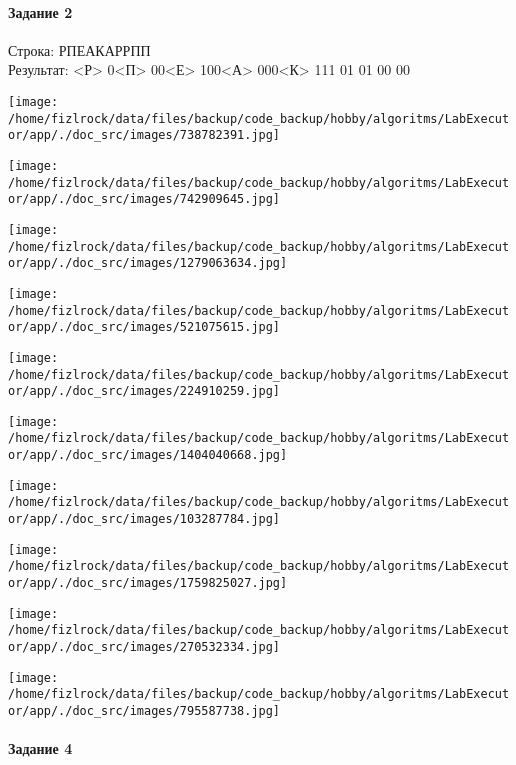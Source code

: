 \documentclass[a4paper, 12pt]{article}
\begin{document}
\paragraph{Задание 2}

Строка: 
РПЕАКАРРПП\\
Результат: <Р> 0<П> 00<Е> 100<А> 000<К> 111 01 01 00 00

\texttt{[image: /home/fizlrock/data/files/backup/code\_backup/hobby/algoritms/LabExecutor/app/./doc\_src/images/738782391.jpg]}

\texttt{[image: /home/fizlrock/data/files/backup/code\_backup/hobby/algoritms/LabExecutor/app/./doc\_src/images/742909645.jpg]}

\texttt{[image: /home/fizlrock/data/files/backup/code\_backup/hobby/algoritms/LabExecutor/app/./doc\_src/images/1279063634.jpg]}

\texttt{[image: /home/fizlrock/data/files/backup/code\_backup/hobby/algoritms/LabExecutor/app/./doc\_src/images/521075615.jpg]}

\texttt{[image: /home/fizlrock/data/files/backup/code\_backup/hobby/algoritms/LabExecutor/app/./doc\_src/images/224910259.jpg]}

\texttt{[image: /home/fizlrock/data/files/backup/code\_backup/hobby/algoritms/LabExecutor/app/./doc\_src/images/1404040668.jpg]}

\texttt{[image: /home/fizlrock/data/files/backup/code\_backup/hobby/algoritms/LabExecutor/app/./doc\_src/images/103287784.jpg]}

\texttt{[image: /home/fizlrock/data/files/backup/code\_backup/hobby/algoritms/LabExecutor/app/./doc\_src/images/1759825027.jpg]}

\texttt{[image: /home/fizlrock/data/files/backup/code\_backup/hobby/algoritms/LabExecutor/app/./doc\_src/images/270532334.jpg]}

\texttt{[image: /home/fizlrock/data/files/backup/code\_backup/hobby/algoritms/LabExecutor/app/./doc\_src/images/795587738.jpg]}
\pagebreak
\paragraph{Задание 4}
\end{document}
